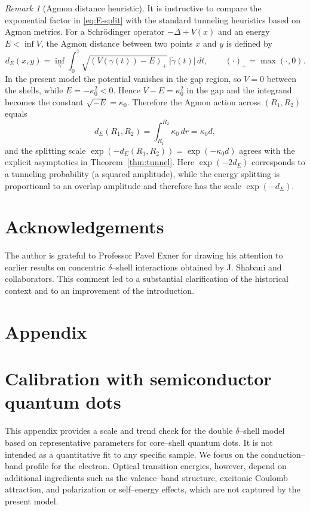 \documentclass[a4paper,11pt]{article}
\numberwithin{equation}{section}
\theoremstyle{definition}
\theoremstyle{remark}
\newtheorem{rem}{Remark}
\begin{document}
\begin{rem}[Agmon distance heuristic]\label{rem:agmon}
It is instructive to compare the exponential factor in \eqref{eq:E-split} with
the standard tunneling heuristics based on Agmon metrics.
For a Schr\"odinger operator $-\Delta+V(x)$ and an energy $E<\inf V$, the Agmon
distance between two points $x$ and $y$ is defined by
$$
d_E(x,y) = \inf_{\gamma}\int_0^1
\sqrt{(V(\gamma(t))-E)_+}\,|\dot\gamma(t)|\,dt ,
\qquad
(\cdot)_+ = \max(\cdot,0).
$$
In the present model the potential vanishes in the gap region, so $V=0$ between
the shells, while $E=-\kappa_0^2<0$.
Hence $V-E=\kappa_0^2$ in the gap and the integrand becomes the constant
$\sqrt{-E}=\kappa_0$.
Therefore the Agmon action across $(R_1,R_2)$ equals
$$
d_E(R_1,R_2)=\int_{R_1}^{R_2}\kappa_0\,dr=\kappa_0 d,
$$
and the splitting scale $\exp(-d_E(R_1,R_2))=\exp(-\kappa_0 d)$ agrees with the
explicit asymptotics in Theorem~\ref{thm:tunnel}.
Here $\exp(-2d_E)$ corresponds to a tunneling probability (a squared amplitude),
while the energy splitting is proportional to an overlap amplitude and
therefore has the scale $\exp(-d_E)$.
\end{rem}

\section*{Acknowledgements}

The author is grateful to Professor Pavel Exner for drawing his attention
to earlier results on concentric $\delta$--shell interactions obtained by
J. Shabani and collaborators.
This comment led to a substantial clarification of the historical context
and to an improvement of the introduction.


\section*{Appendix}

\appendix

\section{Calibration with semiconductor quantum dots}\label{sec:experiment}
This appendix provides a scale and trend check for the double $\delta$--shell model
based on representative parameters for core--shell quantum dots.
It is not intended as a quantitative fit to any specific sample.
We focus on the conduction--band profile for the electron.
Optical transition energies, however, depend on additional ingredients such as
the valence--band structure, excitonic Coulomb attraction, and polarization or
self--energy effects, which are not captured by the present model.
\end{document}
